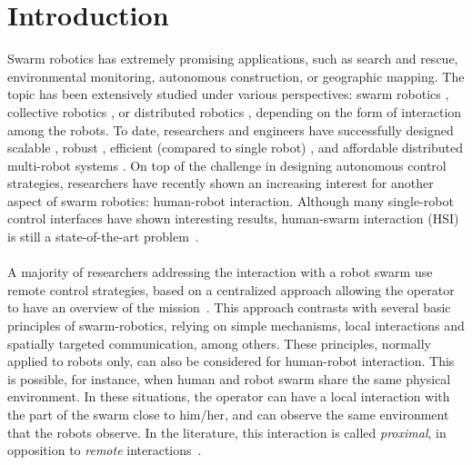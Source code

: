 \documentclass[smallextended]{svjour3}
\begin{document}
\section{Introduction}
\label{sec:introduction}
Swarm robotics has extremely promising applications, such as search and rescue, environmental monitoring, autonomous construction, or geographic mapping. 
The topic has been extensively studied under various perspectives: swarm robotics \cite{brambilla2013}, collective robotics \cite{kernbach2013handbook}, or distributed robotics \cite{martinoli2012distributed}, depending on the form of interaction among the robots. 
To date, researchers and engineers have successfully designed scalable \cite{rubenstein2012kilobot}, robust \cite{winfield2006safety}, efficient (compared to single robot) \cite{Bonani2012}, and affordable distributed multi-robot systems \cite{rubenstein2014programmable}. 
On top of the challenge in designing autonomous control strategies, researchers have recently shown an increasing interest for another aspect of swarm robotics: human-robot interaction. 
Although many single-robot control interfaces have shown interesting results, human-swarm interaction (HSI) is still a state-of-the-art problem~\cite{Kolling2016}. \\
\\
A majority of researchers addressing the interaction with a robot swarm use remote control strategies, based on a centralized approach allowing the operator to have an overview of the mission~\cite{Kolling2016}. 
This approach contrasts with several basic principles of swarm-robotics, relying on simple mechanisms, local interactions and spatially targeted communication, among others. 
These principles, normally applied to robots only, can also be considered for human-robot interaction.
This is possible, for instance, when human and robot swarm share the same physical environment. 
In these situations, the operator can have a local interaction with the part of the swarm close to him/her, and can observe the same environment that the robots observe. 
In the literature, this interaction is called \textit{proximal}, in opposition to \textit{remote} interactions~\cite{Kolling2016}.\\
\\
\end{document}
